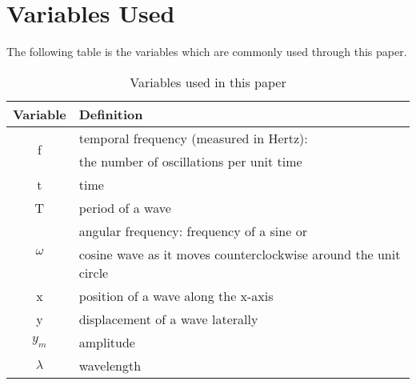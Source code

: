 \chapter{Variables Used}\label{appendix:global-variables}
The following table is the variables which are commonly used through this paper.
\begin{table}[h!]
	\begin{tabular}{| c | l |}
		\hline
		Variable & Definition \\
		\hline
		\multirow{2}{*}{f} & temporal frequency (measured in Hertz): \\ & the number of oscillations per unit time \\
		t & time \\
		T & period of a wave \\
		\multirow{2}{*}{$\omega$} & angular frequency: frequency of a sine or \\ & cosine wave as it moves counterclockwise around the unit circle \\
		x & position of a wave along the x-axis \\
		y & displacement of a wave laterally \\
		$y_m$ & amplitude \\
		$\lambda$ & wavelength \\
		\hline
	\end{tabular}
\caption{Variables used in this paper}
\label{tbl:global-variables}
\end{table}